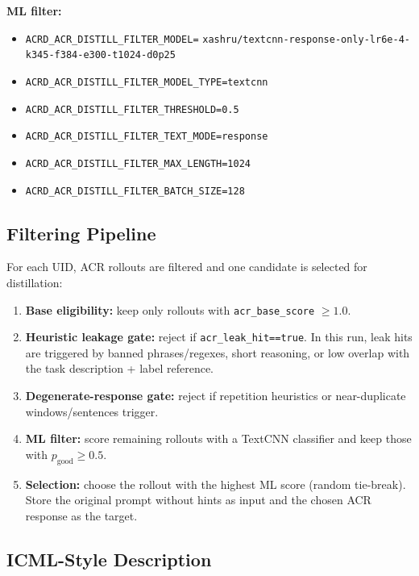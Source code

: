 \textbf{ML filter:}
\begin{itemize}
  \item \texttt{ACRD\_ACR\_DISTILL\_FILTER\_MODEL=}
        \texttt{xashru/textcnn-response-only-lr6e-4-k345-f384-e300-t1024-d0p25}
  \item \texttt{ACRD\_ACR\_DISTILL\_FILTER\_MODEL\_TYPE=textcnn}
  \item \texttt{ACRD\_ACR\_DISTILL\_FILTER\_THRESHOLD=0.5}
  \item \texttt{ACRD\_ACR\_DISTILL\_FILTER\_TEXT\_MODE=response}
  \item \texttt{ACRD\_ACR\_DISTILL\_FILTER\_MAX\_LENGTH=1024}
  \item \texttt{ACRD\_ACR\_DISTILL\_FILTER\_BATCH\_SIZE=128}
\end{itemize}

\subsection{Filtering Pipeline}
\label{subsec:acrd-filtering-pipeline}

For each UID, ACR rollouts are filtered and one candidate is selected for
distillation:
\begin{enumerate}
  \item \textbf{Base eligibility:} keep only rollouts with
        \texttt{acr\_base\_score} $\ge 1.0$.
  \item \textbf{Heuristic leakage gate:} reject if
        \texttt{acr\_leak\_hit==true}. In this run, leak hits are triggered by
        banned phrases/regexes, short reasoning, or low overlap with the task
        description + label reference.
  \item \textbf{Degenerate-response gate:} reject if repetition heuristics or
        near-duplicate windows/sentences trigger.
  \item \textbf{ML filter:} score remaining rollouts with a TextCNN
        classifier and keep those with $p_{\text{good}} \ge 0.5$.
  \item \textbf{Selection:} choose the rollout with the highest ML score
        (random tie-break). Store the original prompt without hints as input
        and the chosen ACR response as the target.
\end{enumerate}

\subsection{ICML-Style Description}
\label{subsec:acrd-filtering-icml}

